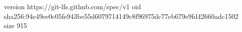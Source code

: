 version https://git-lfs.github.com/spec/v1
oid sha256:94e49ee0c05fe943be55d6079714149c8f96975dc77eb679e9fd42660adc1502
size 915
